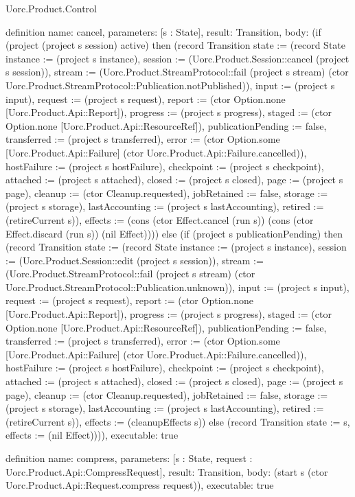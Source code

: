 \begin{lexlean}{Uorc.Product.Control}
\begin{semanticmodule}
definition{
  name: cancel,
  parameters: [s : State],
  result: Transition,
  body: (if (project (project s session) active) then (record Transition {state := (record State {instance := (project s instance), session := (Uorc.Product.Session::cancel (project s session)), stream := (Uorc.Product.StreamProtocol::fail (project s stream) (ctor Uorc.Product.StreamProtocol::Publication.notPublished)), input := (project s input), request := (project s request), report := (ctor Option.none [Uorc.Product.Api::Report]), progress := (project s progress), staged := (ctor Option.none [Uorc.Product.Api::ResourceRef]), publicationPending := false, transferred := (project s transferred), error := (ctor Option.some [Uorc.Product.Api::Failure] (ctor Uorc.Product.Api::Failure.cancelled)), hostFailure := (project s hostFailure), checkpoint := (project s checkpoint), attached := (project s attached), closed := (project s closed), page := (project s page), cleanup := (ctor Cleanup.requested), jobRetained := false, storage := (project s storage), lastAccounting := (project s lastAccounting), retired := (retireCurrent s)}), effects := (cons (ctor Effect.cancel (run s)) (cons (ctor Effect.discard (run s)) (nil Effect)))}) else (if (project s publicationPending) then (record Transition {state := (record State {instance := (project s instance), session := (Uorc.Product.Session::edit (project s session)), stream := (Uorc.Product.StreamProtocol::fail (project s stream) (ctor Uorc.Product.StreamProtocol::Publication.unknown)), input := (project s input), request := (project s request), report := (ctor Option.none [Uorc.Product.Api::Report]), progress := (project s progress), staged := (ctor Option.none [Uorc.Product.Api::ResourceRef]), publicationPending := false, transferred := (project s transferred), error := (ctor Option.some [Uorc.Product.Api::Failure] (ctor Uorc.Product.Api::Failure.cancelled)), hostFailure := (project s hostFailure), checkpoint := (project s checkpoint), attached := (project s attached), closed := (project s closed), page := (project s page), cleanup := (ctor Cleanup.requested), jobRetained := false, storage := (project s storage), lastAccounting := (project s lastAccounting), retired := (retireCurrent s)}), effects := (cleanupEffects s)}) else (record Transition {state := s, effects := (nil Effect)}))),
  executable: true
}

definition{
  name: compress,
  parameters: [s : State, request : Uorc.Product.Api::CompressRequest],
  result: Transition,
  body: (start s (ctor Uorc.Product.Api::Request.compress request)),
  executable: true
}


\end{semanticmodule}
\end{lexlean}
